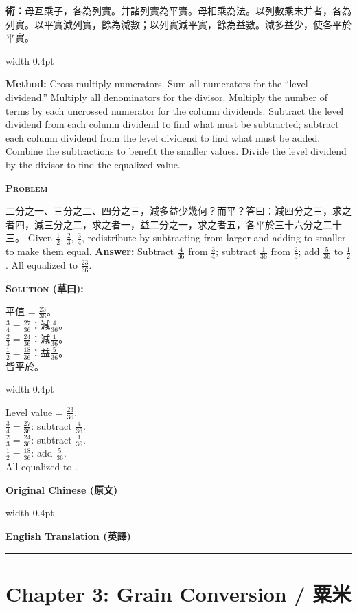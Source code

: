 \documentclass[10pt,a4paper]{article}
\newcommand{\zh}[1]{{\CJKfamily{notocjksc}#1}}
\newcommand{\bilingual}[2]{%
  \par\smallskip\noindent%
  \begin{minipage}[t]{0.47\textwidth}%
    \RaggedRight\small #1%
  \end{minipage}%
  \hfill\vrule width 0.4pt\hfill%
  \begin{minipage}[t]{0.47\textwidth}%
    \RaggedRight\small #2%
  \end{minipage}%
  \par\smallskip%
}
\newenvironment{biproblem}[2][]{%
  \par\smallskip\vspace{1.5ex}%
  \noindent\textbf{\textcolor{problemframe}{\textsc{Problem} #1}}\par\smallskip
  \bgroup\small%
}{%
  \egroup\par\smallskip
}
\newenvironment{bisolution}{%
  \par\smallskip\noindent\textbf{\textcolor{notecolor}{\textsc{Solution} (草曰):}}\par\smallskip\itshape\small%
}{%
  \par\smallskip\normalfont%
}
\newcommand{\colheaders}{%
  \noindent
  \begin{minipage}[t]{0.47\textwidth}%
    \centering\textbf{\small\color{sectioncolor}Original Chinese (原文)}%
  \end{minipage}%
  \hfill\vrule width 0.4pt\hfill
  \begin{minipage}[t]{0.47\textwidth}%
    \centering\textbf{\small\color{sectioncolor}English Translation (英譯)}%
  \end{minipage}%
  \par\vspace{0.5em}%
  \noindent\rule{\textwidth}{0.6pt}\par\vspace{0.5em}%
}
\begin{document}
\bilingual{
  \textbf{術：}母互乘子，各為列實。并諸列實為平實。母相乘為法。以列數乘未并者，各為列實。以平實減列實，餘為減數；以列實減平實，餘為益數。減多益少，使各平於平實。
}{%
  \textbf{Method:} Cross-multiply numerators. Sum all numerators for the ``level dividend.'' Multiply all denominators for the divisor. Multiply the number of terms by each uncrossed numerator for the column dividends. Subtract the level dividend from each column dividend to find what must be subtracted; subtract each column dividend from the level dividend to find what must be added. Combine the subtractions to benefit the smaller values. Divide the level dividend by the divisor to find the equalized value.
}

\begin{biproblem}
\bilingual{
  \zh{二分之一、三分之二、四分之三，減多益少幾何？而平？答曰：減四分之三，求之者四，減三分之二，求之者一，益二分之一，求之者五，各平於三十六分之二十三。}
}{%
  Given $\frac{1}{2}$, $\frac{2}{3}$, $\frac{3}{4}$, redistribute by subtracting from larger and adding to smaller to make them equal. \textbf{Answer:} Subtract $\frac{4}{36}$ from $\frac{3}{4}$; subtract $\frac{1}{36}$ from $\frac{2}{3}$; add $\frac{5}{36}$ to $\frac{1}{2}$. All equalized to $\frac{23}{36}$.
}
\end{biproblem}

\begin{bisolution}
\bilingual{
  平值 = $$。\\
  $\frac{3}{4} = \frac{27}{36}$：減$\frac{4}{36}$。\\
  $\frac{2}{3} = \frac{24}{36}$：減$\frac{1}{36}$。\\
  $\frac{1}{2} = \frac{18}{36}$：益$\frac{5}{36}$。\\
  皆平於\textbf{\frac{23}{36}}。
}{%
  Level value = $\frac{23}{36}$.\\
  $\frac{3}{4} = \frac{27}{36}$: subtract $\frac{4}{36}$.\\
  $\frac{2}{3} = \frac{24}{36}$: subtract $\frac{1}{36}$.\\
  $\frac{1}{2} = \frac{18}{36}$: add $\frac{5}{36}$.\\
  All equalized to \textbf{\frac{23}{36}}.
}
\end{bisolution}

\newpage
\colheaders

\section{Chapter 3: Grain Conversion / \zh{粟米}}
\end{document}
